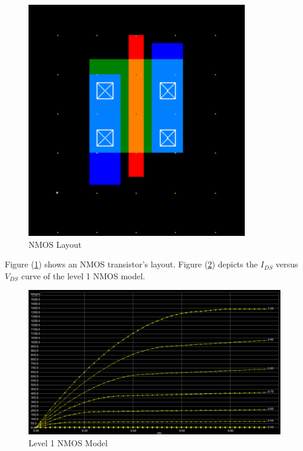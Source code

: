 \FloatBarrier

\begin{figure}[h!]
	\centering
	\includegraphics[scale=0.50]{./images/nmos_layout.PNG}
	\caption{NMOS Layout}
	\label{fig:nmos}
\end{figure}

\FloatBarrier

Figure (\ref{fig:nmos}) shows an NMOS transistor's layout. Figure (\ref{fig:l1_mos}) depicts the $I_{DS}$ versus $V_{DS}$ curve of the level 1 NMOS model.

\FloatBarrier

\begin{figure}[h!]
	\centering
	\includegraphics[scale=0.50]{./images/level1_id_vds_nmos.PNG}
	\caption{Level 1 NMOS Model}
	\label{fig:l1_mos}
\end{figure}

\FloatBarrier

